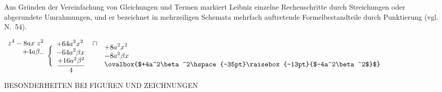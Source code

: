 Aus Gr\"{u}nden der Vereinfachung von Gleichungen und Termen markiert Leibniz einzelne Rechenschritte durch Streichungen oder abgerundete Umrahmungen, und er bezeichnet in mehrzeiligen Schemata mehrfach auftretende Formelbestandteile durch Punktierung (vgl. N.~54).
\begin{center}
   $\begin{array}{r}\displaystyle z^4- 8ax\hspace{3pt}z^2\\+4a\beta ..\\\rule[0cm]{0cm}{20pt}
                               \end{array}
                               \Bigg\{\begin{array}{ll}\displaystyle+64a^2x^2&\sqcap\\\displaystyle-64a^2\beta x&\\\displaystyle \frac{+16a^2\beta^2}{4}&\end{array}
                     \begin{array}{ll}\displaystyle+8a^2x^2&\\\displaystyle-8a^2\beta x&\\\displaystyle \ovalbox{$+4a^2\beta^2\hspace{-35pt}\raisebox{-13pt}{$-4a^2\beta^2$}$}&\end{array}$
\end{center}
\clearpage

\uppercase{Besonderheiten bei Figuren und Zeichnungen}\par\vspace{1.0ex}

